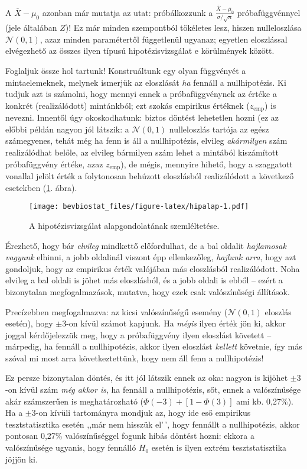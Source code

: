 \documentclass[
]{book}
\begin{document}
A \(\overline{X}-\mu_0\) azonban már mutatja az utat: próbálkozzunk a \(\frac{\overline{X}-\mu_0}{\sigma/\sqrt{n}}\) próbafüggvénnyel (jele általában \(Z\))! Ez már minden szempontból tökéletes lesz, hiszen nulleloszlása \(\mathcal{N}\left(0,1\right)\), azaz minden paramétertől függetlenül ugyanaz; egyetlen eloszlással elvégezhető az összes ilyen típusú hipotézisvizsgálat e körülmények között.

Foglaljuk össze hol tartunk! Konstruáltunk egy olyan függvényét a mintaelemeknek, melynek ismerjük az eloszlását \emph{ha} fennáll a nullhipotézis. Ki tudjuk azt is számolni, hogy mennyi ennek a próbafüggvénynek az értéke a konkrét (realizálódott) mintánkból; ezt szokás empirikus értéknek (\(z_{\mathrm{emp}}\)) is nevezni. Innentől úgy okoskodhatunk: biztos döntést lehetetlen hozni (ez az előbbi példán nagyon jól látszik: a \(\mathcal{N}\left(0,1\right)\) nulleloszlás tartója az egész számegyenes, tehát még ha fenn is áll a nullhipotézis, elvileg \emph{akármilyen} szám realizálódhat belőle, az elvileg bármilyen szám lehet a mintából kiszámított próbafüggvény értéke, azaz \(z_{\mathrm{emp}}\)), de mégis, mennyire hihető, hogy a szaggatott vonallal jelölt érték a folytonosan behúzott eloszlásból realizálódott a következő esetekben (\ref{fig:hipalap}. ábra).

\begin{figure}
\centering
\texttt{[image: bevbiostat\_files/figure-latex/hipalap-1.pdf]}
\caption{\label{fig:hipalap}A hipotézisvizsgálat alapgondolatának szemléltetése.}
\end{figure}

Érezhető, hogy bár \emph{elvileg} mindkettő előfordulhat, de a bal oldalit \emph{hajlamosak vagyunk} elhinni, a jobb oldalinál viszont épp ellenkezőleg, \emph{hajlunk arra}, hogy azt gondoljuk, hogy az empirikus érték valójában más eloszlásból realizálódott. Noha elvileg a bal oldali is jöhet más eloszlásból, és a jobb oldali is ebből -- ezért a bizonytalan megfogalmazások, mutatva, hogy ezek csak valószínűségi állítások.

Precízebben megfogalmazva: az kicsi valószínűségű esemény (\(\mathcal{N}\left(0,1\right)\) eloszlás esetén), hogy \(\pm 3\)-on kívül számot kapjunk. Ha \emph{mégis} ilyen érték jön ki, akkor joggal kérdőjelezzük meg, hogy a próbafüggvény ilyen eloszlást követett -- márpedig, ha fennáll a nullhipotézis, akkor ilyen eloszlást \emph{kellett} követnie, így más szóval mi most arra következtettünk, hogy nem áll fenn a nullhipotézis!

Ez persze bizonytalan döntés, és itt jól látszik ennek az oka: nagyon is kijöhet \(\pm 3\)-on kívül szám \emph{még akkor is}, ha fennáll a nullhipotézis, sőt, ennek a valószínűsége akár számszerűen is meghatározható (\(\Phi\left(-3\right)+\left[1-\Phi\left(3\right)\right]\) ami kb. 0,27\%). Ha a \(\pm 3\)-on kívüli tartományra mondjuk az, hogy ide eső empirikus tesztstatisztika esetén ,,már nem hisszük el'\,', hogy fennállt a nullhipotézis, akkor pontosan 0,27\% valószínűséggel fogunk hibás döntést hozni: ekkora a valószínűsége ugyanis, hogy fennálló \(H_0\) esetén is ilyen extrém tesztstatisztika jöjjön ki.
\end{document}
